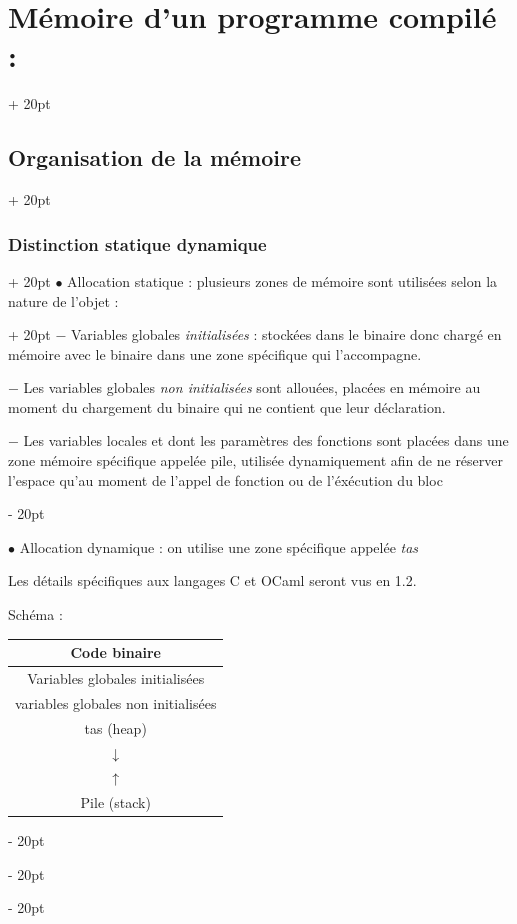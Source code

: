 \documentclass[a4paper, 12pt, twoside]{article}
\newcommand{\ind}[1][20pt]{\advance\leftskip + #1}
\newcommand{\deind}[1][20pt]{\advance\leftskip - #1}
\newenvironment{indentedenv}[1][20pt]{\par \ind[#1]}{\par \deind}
\newenvironment{indt}[2][20pt]{#2 \begin{indentedenv}[#1]}{\end{indentedenv}} %
\begin{document}
\begin{indt}{\section{Mémoire d'un programme compilé :}}
\begin{indt}{\subsection{Organisation de la mémoire}}
\begin{indt}{\subsubsection{Distinction statique dynamique}}
                \begin{indt}{$\bullet$ Allocation statique : plusieurs zones de mémoire sont utilisées selon la nature de l'objet :}
                    $-$ Variables globales \textit{initialisées} : stockées dans le binaire donc chargé en mémoire avec le binaire dans une zone spécifique qui l'accompagne.
                    
                    \vspace{6pt}
                    
                    $-$ Les variables globales \textit{non initialisées} sont allouées, placées en mémoire au moment du chargement du binaire qui ne contient que leur déclaration.
                    
                    \vspace{6pt}
                    
                    $-$ Les variables locales et dont les paramètres des fonctions sont placées dans une zone mémoire spécifique appelée pile, utilisée dynamiquement afin de ne réserver l'espace qu'au moment de l'appel de fonction ou de l'éxécution du bloc
                \end{indt}
                
                \vspace{12pt}
                
                $\bullet$ Allocation dynamique : on utilise une zone spécifique appelée \textit{tas}
                
                Les détails spécifiques aux langages C et OCaml seront vus en 1.2.
                
                \vspace{6pt}
                
                Schéma :
                
                \begin{tabular}{c}
                    
                    \hline
                    Code binaire
                    \\
                    \hline
                    Variables globales initialisées
                    \\
                    \hline
                    variables globales non initialisées
                    \\
                    \hline
                    tas (heap)
                    \\
                    $\downarrow$
                    \\
                    \hline
                    $\uparrow$
                    \\
                    Pile (stack)
                    \\
                    \hline
                \end{tabular}
                

\end{indt}
\end{indt}
\end{indt}
\end{document}
